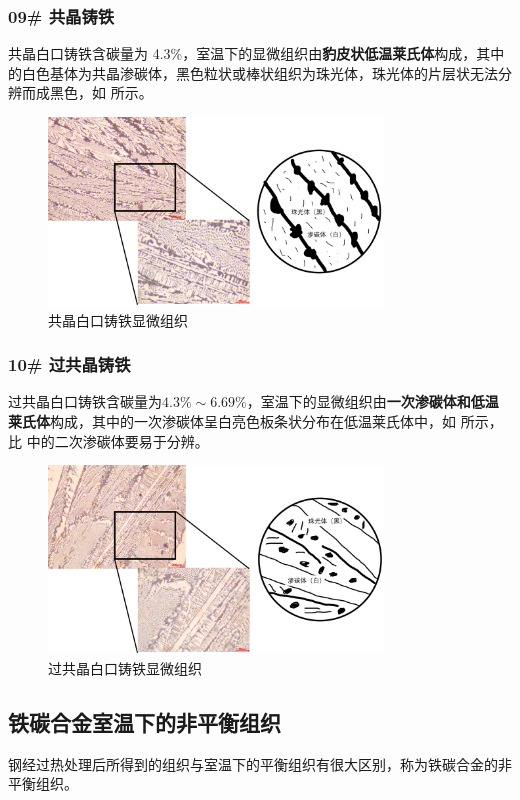 \documentclass[a4paper,utf8]{article}
\begin{document}
        \subsubsection{09\# 共晶铸铁}
            共晶白口铸铁含碳量为 4.3\%，室温下的显微组织由\textbf{豹皮状低温莱氏体}构成，其中的白色基体为共晶渗碳体，黑色粒状或棒状组织为珠光体，珠光体的片层状无法分辨而成黑色，如 所示。
            \begin{figure}[!ht]
                \includegraphics[height=50mm]{result/6.pdf}
                \caption{共晶白口铸铁显微组织\label{fig:6}}
            \end{figure}

        \subsubsection{10\# 过共晶铸铁}
            过共晶白口铸铁含碳量为$4.3\%\sim 6.69\%$，室温下的显微组织由\textbf{一次渗碳体和低温莱氏体}构成，其中的一次渗碳体呈白亮色板条状分布在低温莱氏体中，如 所示，比 中的二次渗碳体要易于分辨。
            \begin{figure}[!ht]
                \includegraphics[height=50mm]{result/7.pdf}
                \caption{过共晶白口铸铁显微组织\label{fig:7}}
            \end{figure}
    \subsection{铁碳合金室温下的非平衡组织}
        钢经过热处理后所得到的组织与室温下的平衡组织有很大区别，称为铁碳合金的非平衡组织。\par
\end{document}
